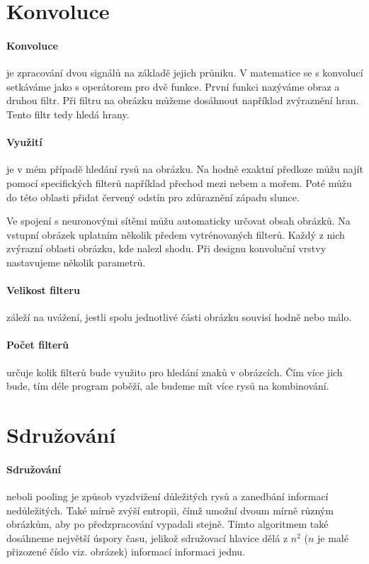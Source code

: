 \documentclass[12pt,a4paper]{report}
\begin{document}
	\section{Konvoluce}
		\paragraph{Konvoluce}
		je zpracování dvou signálů na základě jejich průniku. V matematice se s konvolucí setkáváme jako s operátorem pro dvě funkce. První funkci nazýváme obraz a druhou filtr. Při filtru na obrázku můžeme dosáhnout například zvýraznění hran. Tento filtr tedy hledá hrany.
		\paragraph{Využití}
		je v mém případě hledání rysů na obrázku. Na hodně exaktní předloze můžu najít pomocí specifických filterů například přechod mezi nebem a mořem. Poté můžu do této oblasti přidat červený odstín pro zdůraznění západu slunce.
		
		Ve spojení s neuronovými sítěmi můžu automaticky určovat obsah obrázků. Na vstupní obrázek uplatním několik předem vytrénovaných filterů. Každý z nich zvýrazní oblasti obrázku, kde nalezl shodu. Při designu konvoluční vrstvy nastavujeme několik parametrů.
		
		\paragraph{Velikost filteru}
		záleží na uvážení, jestli spolu jednotlivé části obrázku souvisí hodně nebo málo.
		\paragraph{Počet filterů}
		určuje kolik filterů bude využito pro hledání znaků v obrázcích. Čím více jich bude, tím déle program poběží, ale budeme mít více rysů na kombinování.
	\section{Sdružování}
	 	\paragraph{Sdružování}
	 	neboli pooling je způsob vyzdvižení důležitých rysů a zanedbání informací nedůležitých. Také mírně zvýší entropii, čímž umožní dvoum mírně různým obrázkům, aby po předzpracování vypadali stejně. Tímto algoritmem také dosáhneme největší úspory času, jelikož sdružovací hlavice dělá z $n^2$ ($n$ je malé přizozené číslo viz. obrázek) informací informaci jednu.
\end{document}
